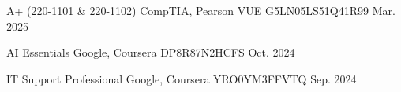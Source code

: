 
\begin{cvhonors}

	\cvhonor
	{A+ (220-1101 \& 220-1102)} 
	{CompTIA, Pearson VUE} 
	{G5LN05LS51Q41R99}
	{Mar. 2025}


	\cvhonor
	{AI Essentials} %
	{Google, Coursera} %
	{DP8R87N2HCFS} %
	{Oct. 2024} %

	\cvhonor
	{IT Support Professional} %
	{Google, Coursera} %
	{YRO0YM3FFVTQ} %
	{Sep. 2024} %


\end{cvhonors}
